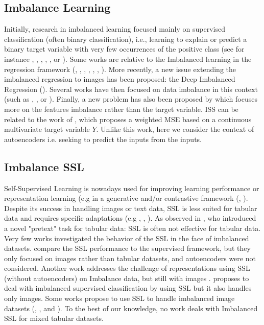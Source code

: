 \documentclass{article}
\theoremstyle{definition}
\begin{document}
\subsection{Imbalance Learning}
Initially, research in imbalanced learning focused mainly on supervised classification (often binary classification), i.e., learning to explain or predict a binary target variable with very few occurrences of the positive class (see for instance \citep{buda2018},  \citep{cao2019}, \citep{cui2019},  \citep{huang2016},  \citep{yang2020}, \citep{branco2016survey} or \citep{fernandez2018smote}). Some works are relative to the Imbalanced learning in the regression framework (\citep{torgo2007utility}, \citep{torgo2013smote}, \citep{branco2017smogn}, \citep{branco2019pre}, \citep{ribeiro2020imbalanced}, \citep{song2022distsmogn}, \citep{camacho2022geometric}).
More recently, a new issue extending the imbalanced regression to images has been proposed: the Deep Imbalanced Regression (\citep{yang2021}). Several works have then focused on data imbalance in this context (such as \citep{sen2023dealing}, \citep{ding2022deep}, or \citep{gong2022ranksim}). Finally, a new problem has also been proposed by \citep{stocksieker2023data} which focuses more on the features imbalance rather than the target variable.
ISS can be related to the work of \citep{ren2022balanced}, which proposes a weighted MSE based on a continuous multivariate target variable $Y$. Unlike this work, here we consider the context of autoencoders i.e. seeking to predict the inputs from the inputs. 

\subsection{Imbalance SSL}
Self-Supervised Learning is nowadays used for improving learning performance or representation learning (e.g in a generative and/or contrastive framework (\citep{liu2021SSL}, \citep{jaiswal2020survey}).
Despite its success in handling images or text data, SSL is less suited for tabular data and requires specific adaptations (e.g \citep{ucar2021subtab}, \citep{hajiramezanali2022stab}, \citep{darabi2021contrastive}).  As observed in \citep{yoon2020vime}, who introduced a novel "pretext" task for tabular data: SSL is often not effective for tabular data. Very few works investigated the behavior of the SSL in the face of imbalanced datasets. \citep{liu2021self} compare the SSL performance to the supervised framework, but they only focused on images rather than tabular datasets, and autoencoders were not considered. %
Another work addresses the challenge of representations using SSL (without autoencoders) on Imbalance data, but still with images \citep{li2021imbalance}. \citep{yang2020rethinking} proposes to deal with imbalanced supervised classification by using SSL but it also handles only images. Some works propose to use SSL to handle imbalanced image datasets (\citep{hou2022contrastive}, \citep{timofeev2021self}, \citep{elbatel2023federated} and \citep{chen2021self}).
To the best of our knowledge, no work deals with Imbalanced SSL for mixed tabular datasets.
\end{document}
